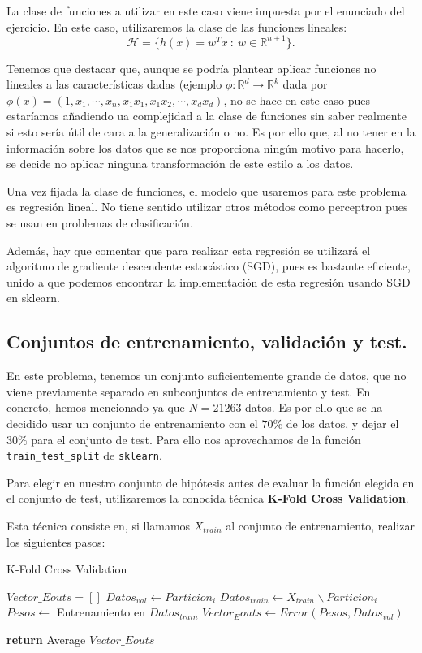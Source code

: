\documentclass[a4paper, 20pt]{article}
\newcommand{\R}{\mathbb R}
\begin{document}
La clase de funciones a utilizar en este caso viene impuesta por el enunciado del ejercicio. En este caso, utilizaremos la clase de las funciones lineales:
$$
\mathcal H = \{ h(x) = w^T x \ : \ w \in \R^{n+1}\}.
$$

Tenemos que destacar que, aunque se podría plantear aplicar funciones no lineales a las características dadas (ejemplo $\phi :\R^d \to \R^{k}$ dada por $\phi(x) = (1,x_1,\cdots,x_n,x_1x_1,x_1x_2,\cdots,x_dx_d)$, no se hace en este caso pues estaríamos añadiendo ua complejidad a la clase de funciones sin saber realmente si esto sería útil de cara a la generalización o no. Es por ello que, al no tener en la información sobre los datos que se nos proporciona ningún motivo para hacerlo, se decide no aplicar ninguna transformación de este estilo a los datos.

Una vez fijada la clase de funciones, el modelo que usaremos para este problema es regresión lineal. No tiene sentido utilizar otros métodos como perceptron pues se usan en problemas de clasificación. 

Además, hay que comentar que para realizar esta regresión se utilizará el algoritmo de gradiente descendente estocástico (SGD), pues es bastante eficiente, unido a que podemos encontrar la implementación de esta regresión usando SGD en sklearn.

\subsection{Conjuntos de entrenamiento, validación y test.}

En este problema, tenemos un conjunto suficientemente grande de datos, que no viene previamente separado en subconjuntos de entrenamiento y test. En concreto, hemos mencionado ya que $N = 21263$ datos. Es por ello que se ha decidido usar un conjunto de entrenamiento con el $70\%$ de los datos, y dejar el $30\%$ para el conjunto de test. Para ello nos aprovechamos de la función \lstinline{train_test_split} de \lstinline{sklearn}.

Para elegir en nuestro conjunto de hipótesis antes de evaluar la función elegida en el conjunto de test, utilizaremos la conocida técnica \textbf{K-Fold Cross Validation}.

Esta técnica consiste en, si llamamos $X_{train}$ al conjunto de entrenamiento, realizar los siguientes pasos:
\begin{algorithm}[H]
  \caption{K-Fold Cross Validation}
  \begin{algorithmic}[1]
  \State $Vector\_Eouts = []$
    \State $ Datos_{val} \gets Particion_i$
    \State $ Datos_{train} \gets X_{train} \backslash Particion _i$
    \State $ Pesos \gets $ Entrenamiento en $Datos_{train}$
    \State $ Vector_Eouts \gets Error(Pesos, Datos_{val})$

  \EndFor

  \State \textbf{return} Average $Vector\_Eouts$
  
  \end{algorithmic}
\end{algorithm}
\end{document}
